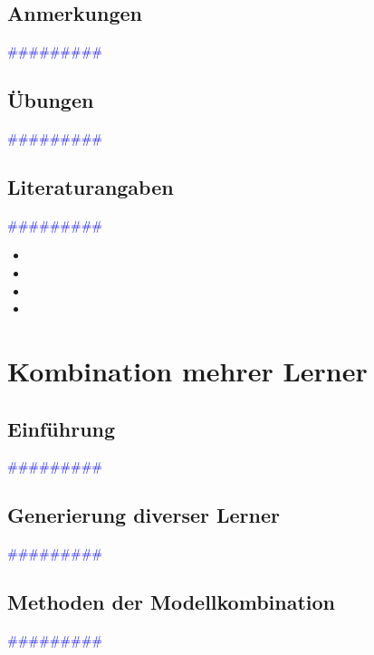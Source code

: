 \documentclass{article}
\begin{document}
  \subsection{Anmerkungen} %
      \textcolor{blue}{\#\#\#\#\#\#\#\#\#}
  \subsection{Übungen} %
      \textcolor{blue}{\#\#\#\#\#\#\#\#\#}
  \subsection{Literaturangaben} %
      \textcolor{blue}{\#\#\#\#\#\#\#\#\#}

      \begin{itemize}
      \color{red}
        \item
        \item
       \color{ForestGreen}
        \item
        \item
      \end{itemize}




\newpage
\section{Kombination mehrer Lerner} %
  \subsection{Einführung} %
      \textcolor{blue}{\#\#\#\#\#\#\#\#\#}
  \subsection{Generierung diverser Lerner} %
      \textcolor{blue}{\#\#\#\#\#\#\#\#\#}
  \subsection{Methoden der Modellkombination} %
      \textcolor{blue}{\#\#\#\#\#\#\#\#\#}
\end{document}
